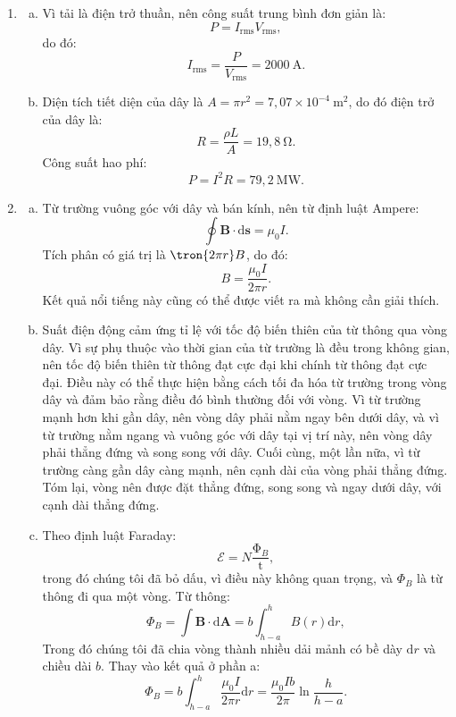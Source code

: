 \begin{loigiai}
\begin{enumerate}[1.]
    \item 
    \begin{enumerate}[a.]
        \item Vì tải là điện trở thuần, nên công suất trung bình đơn giản là:
        $$P=I_\mathrm{rms}V_\mathrm{rms},$$
        do đó:
        $$I_\mathrm{rms}=\dfrac{P}{V_\mathrm{rms}}=2000~\mathrm{A}.$$
        \item Diện tích tiết diện của dây là $A=\pi r^2=7,07\times 10^{-4}~\mathrm{m^2}$, do đó điện trở của dây là:
        $$R=\dfrac{\rho L}{A}=19,8 ~\mathrm{\Omega}.$$
        Công suất hao phí:
        $$P=I^2 R=79,2 ~\mathrm{MW}.$$
    \end{enumerate}
    \item
    \begin{enumerate}[a)]
        \item Từ trường vuông góc với dây và bán kính, nên từ định luật Ampere:
        $$
\oint \mathbf{B} \cdot \mathrm{d} \mathbf{s}=\mu_{0} I.$$
Tích phân có giá trị là $\tron{2\pi r}B$, do đó:
$$B=\dfrac{\mu_0 I}{2\pi r}.$$
Kết quả nổi tiếng này cũng có thể được viết ra mà không cần giải thích.
 \item Suất điện động cảm ứng tỉ lệ với tốc độ biến thiên của từ thông qua vòng dây. Vì sự phụ thuộc vào thời gian của từ trường là đều trong không gian, nên tốc độ biến thiên từ thông đạt cực đại khi chính từ thông đạt cực đại. Điều này có thể thực hiện bằng cách tối đa hóa từ trường trong vòng dây và đảm bảo rằng điều đó bình thường đối với vòng. Vì từ trường mạnh hơn khi gần dây, nên vòng dây phải nằm ngay bên dưới dây, và vì từ trường nằm ngang và vuông góc với dây tại vị trí này, nên vòng dây phải thẳng đứng và song song với dây. Cuối cùng, một lần nữa, vì từ trường càng gần dây càng mạnh, nên cạnh dài của vòng phải thẳng đứng.\\
 Tóm lại, vòng nên được đặt thẳng đứng, song song và ngay dưới dây, với cạnh dài thẳng đứng.
 \item Theo định luật Faraday:
 $$\mathcal{E}=N\dfrac{\mathrm \Phi_B}{\mathrm t},$$
 trong đó chúng tôi đã bỏ dấu, vì điều này không quan trọng, và $\Phi_B$ là từ thông đi qua một vòng. Từ thông:
 $$
\Phi_{B}=\int \mathbf{B} \cdot \mathrm{d}\mathbf{A}=b \int_{h-a}^{h} B(r) \mathrm{d} r,
$$
Trong đó chúng tôi đã chia vòng thành nhiều dải mảnh có bề dày $\mathrm{d}r$ và chiều dài $b$. Thay vào kết quả ở phần a:
$$
\Phi_{B}=b \int_{h-a}^{h} \dfrac{\mu_{0} I}{2 \pi r} \mathrm{d} r=\dfrac{\mu_{0} I b}{2 \pi} \ln \frac{h}{h-a}.
$$
\end{enumerate}
\end{enumerate}
\end{loigiai}
